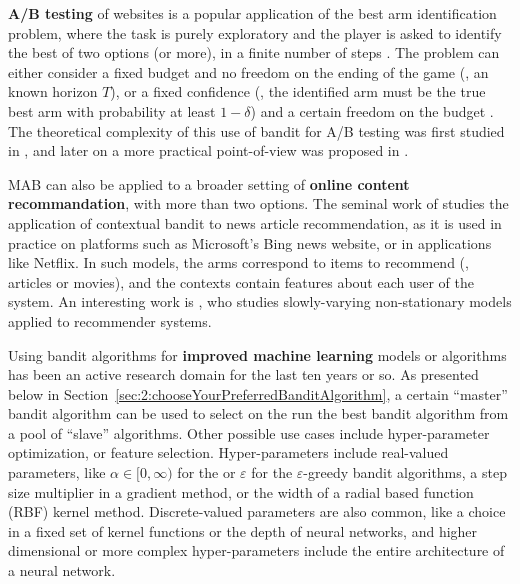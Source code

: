 %
    \textbf{A/B testing} of websites is a popular application of the best arm identification problem,
    where the task is purely exploratory and the player is asked to identify the best of two options (or more), in a finite number of steps \cite{audibert2010best}.
    The problem can either consider a fixed budget and no freedom on the ending of the game (\ie, an known horizon $T$), or a fixed confidence (\ie, the identified arm must be the true best arm with probability at least $1-\delta$) and a certain freedom on the budget \cite{Garivier16BAI}.
    The theoretical complexity of this use of bandit for A/B testing was first studied in \cite{Kaufmann14},
    and later on a more practical point-of-view was proposed in \cite{Jamieson17ABTest}.

    MAB can also be applied to a broader setting of \textbf{online content recommandation},
    with more than two options.
    The seminal work of \cite{Li10} studies the application of contextual bandit to news article recommendation, as it is used in practice on platforms such as Microsoft's Bing news website,
    or in applications like Netflix.
    In such models, the arms correspond to items to recommend (\eg, articles or movies), and the contexts contain features about each user of the system.
    An interesting work is \cite{Louedec16}, who studies slowly-varying non-stationary models applied to recommender systems.

    Using bandit algorithms for \textbf{improved machine learning} models or algorithms has been an active research domain for the last ten years or so.
    As presented below in Section~\ref{sec:2:chooseYourPreferredBanditAlgorithm}, a certain ``master'' bandit algorithm can be used to select on the run the best bandit algorithm from a pool of ``slave'' algorithms.
    Other possible use cases include hyper-parameter optimization, or feature selection.
    Hyper-parameters include real-valued parameters, like $\alpha\in[0,\infty)$ for the \UCB{} or $\varepsilon$ for the $\varepsilon$-greedy bandit algorithms, a step size multiplier in a gradient method, or the width of a radial based function (RBF) kernel method.
    Discrete-valued parameters are also common, like a choice in a fixed set of kernel functions or the depth of neural networks,
    and higher dimensional or more complex hyper-parameters include the entire architecture of a neural network.

